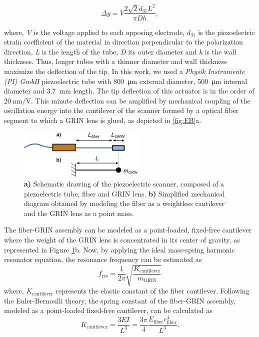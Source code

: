 \documentclass[10pt]{iopart}
\begin{document}
\begin{equation}
	\Delta y = V  \frac{2 \sqrt{2} d_{31} L^2}{\pi D h},
\end{equation}

where, \textit{V} is the voltage applied to each opposing electrode, $d_{31}$ is the piezoelectric strain coefficient of the material in direction perpendicular to the polarization direction, \textit{L} is the length of the tube, \textit{D} its outer diameter and \textit{h} is the wall thickness. Thus, longer tubes with a thinner diameter and wall thickness maximize the deflection of the tip. In this work, we used a \textit{Physik Instrumente (PI) GmbH} piezoelectric tube with \SI{800}{\micro\meter} external diameter, \SI{500}{\micro\meter} internal diameter and \SI{3.7}{\milli\meter} length. The tip deflection of this actuator is in the order of $\SI{20}{\nano\meter / \volt}$. This minute deflection can be amplified by mechanical coupling of the oscillation energy into the cantilever of the scanner formed by a optical fiber segment to which a GRIN lens is glued, as depicted in \autoref{fig:EB}a.

\begin{figure}[h!]\centering
      \includegraphics[width=6cm]{figures/EB.pdf}
      \caption{\textbf{a)} Schematic drawing of the piezoelectric scanner, composed of a piezoelectric tube, fiber and GRIN lens. 
      \textbf{b)} Simplified mechanical diagram obtained by modeling the fiber as a weightless cantilever and the GRIN lens as a point mass.}
      \label{fig:EB}
\end{figure}

The fiber-GRIN assembly can be modeled as a point-loaded, fixed-free cantilever where the weight of the GRIN lens is concentrated in its center of gravity, as represented in Figure \ref{fig:EB}b. Now, by applying the ideal mass-spring harmonic resonator equation, the resonance frequency can be estimated as 
\begin{equation}
	f_\mathrm{res} = \frac{1}{2 \pi} \sqrt{\frac{K_\mathrm{cantilever}}{m_{\mathrm{GRIN}}}} 
	\label{eq:fres}
\end{equation}
where, $K_\mathrm{cantilever}$ represents the elastic constant of the fiber cantilever. Following the Euler-Bernoulli theory, the spring constant of the fiber-GRIN assembly, modeled as a point-loaded fixed-free cantilever, can be calculated as 
\begin{equation}
	K_\mathrm{cantilever} = \frac{3 E I}{L^3} = \frac{3 \pi}{4} \frac{E_\mathrm{fiber} r_\mathrm{fiber}^4}{L^3}.
	\label{eq:EB}
\end{equation}
\end{document}
